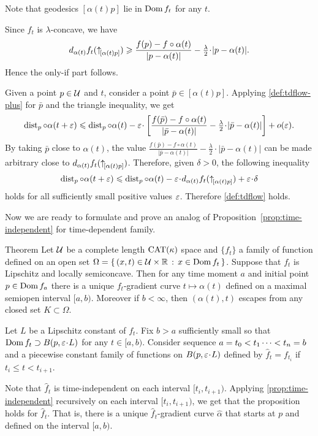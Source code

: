 \documentclass[oneside,a4paper, 12pt]{article}
\begin{document}
Note that geodesics $[\alpha(t)p]$ lie in $\mathop{\rm Dom}\nolimits f_t$ for any $t$.

Since $f_t$ is $\lambda$-concave, we have 
\[d_{\alpha(t)}f_t(\dir{\alpha(t)}p)
\ge
\frac{f(p)-f\circ\alpha(t)}{|p-\alpha(t)|}-\tfrac\lambda2\cdot |p-\alpha(t)|.\]
Hence the only-if part follows.

Given a point $p\in \mathcal{U}$ and $t$,
consider a point $\bar p\in [\alpha(t)p]$.
Applying \ref{def:tdflow-plus} for $\bar p$ and the triangle inequality, we get
\[\dist_p\circ\alpha(t+\eps)
\le
\dist_p\circ\alpha(t)-\eps\cdot \left[\frac{f(\bar p)-f\circ\alpha(t)}{|\bar p-\alpha(t)|}-\tfrac\lambda2\cdot |\bar p-\alpha(t)|\right]+o(\eps).\]
By taking $\bar p$ close to $\alpha(t)$,
the value $\tfrac{f(\bar p)-f\circ\alpha(t)}{|\bar p-\alpha(t)|}-\tfrac\lambda2\cdot |\bar p-\alpha(t)|$ can be made arbitrary close to $d_{\alpha(t)}f_t({\uparrow}_{\![{\alpha(t)}{p}]})$.
Therefore, given $\delta>0$, the following inequality
\[\dist_p\circ\alpha(t+\eps)\le \dist_p\circ\alpha(t)-\eps\cdot d_{\alpha(t)}f_t(\dir{\alpha(t)}p)+\eps\cdot\delta\]
holds for all sufficiently small positive values $\varepsilon$.
Therefore \ref{def:tdflow} holds.
\qeds


Now we are ready to formulate and prove an analog of Proposition~\ref{prop:time-independent} for time-dependent family.

\begin{thm}{Theorem}\label{prop:time-dependent}
Let $\mathcal{U}$ be a complete length $\mathrm{CAT}(\kappa)$ space and
$\{f_t\}$ a family of function defined on an open set $\Omega=\{\,{(x,t)\in \mathcal{U}\times\mathbb{R}}\,:\,{x\in \mathop{\rm Dom}\nolimits f_t}\,\}$.
Suppose that $f_t$ is Lipschitz and locally semiconcave.
Then for any time moment $a$ and initial point $p\in \mathop{\rm Dom}\nolimits f_a$ there is a unique $f_t$-gradient curve $t\mapsto\alpha(t)$ defined on a maximal semiopen interval $[a,b)$. 
Moreover if $b<\infty$, then $(\alpha(t),t)$ escapes from any closed set $K\subset \Omega$.
\end{thm}

Let $L$ be a Lipschitz constant of $f_t$.
Fix $b>a$ sufficiently small so that $\Dom f_t\supset B(p,\eps\cdot L)$ for any $t\in[a,b)$.
Consider sequence  $a=t_0<t_1\dots<t_n\z=b$ and a piecewise constant family of functions on $B(p,\eps\cdot L)$ defined by $\hat f_t=f_{t_i}$ if $t_i\le t<t_{i+1}$.

Note that $\hat f_t$ is time-independent on each interval $[t_i,t_{i+1})$.
Applying \ref{prop:time-independent} recursively on each interval $[t_i,t_{i+1})$, we get that the proposition holds for $\hat f_t$.
That is, there is a unique $\hat f_t$-gradient curve $\hat \alpha$ that starts at $p$ and defined on the interval $[a,b)$.
\end{document}
